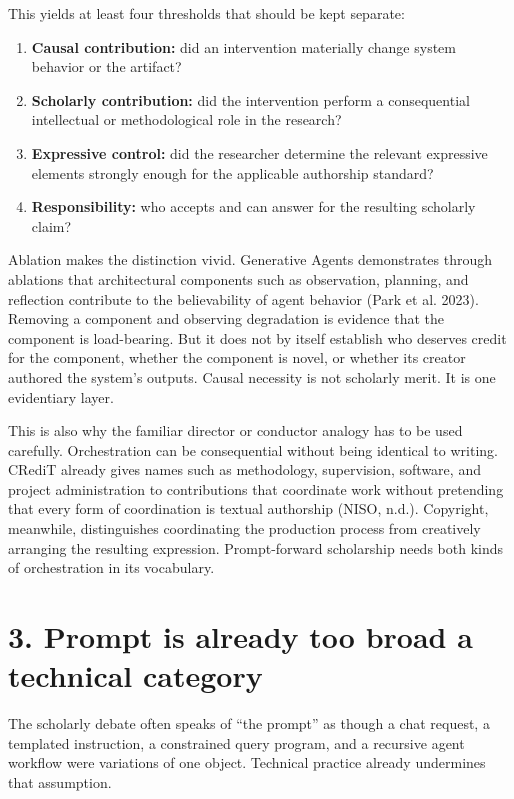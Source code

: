 \documentclass[
]{article}
\providecommand{\tightlist}{%
  \setlength{\itemsep}{0pt}\setlength{\parskip}{0pt}}
\begin{document}
This yields at least four thresholds that should be kept separate:

\begin{enumerate}
\def\labelenumi{\arabic{enumi}.}
\tightlist
\item
  \textbf{Causal contribution:} did an intervention materially change
  system behavior or the artifact?
\item
  \textbf{Scholarly contribution:} did the intervention perform a
  consequential intellectual or methodological role in the research?
\item
  \textbf{Expressive control:} did the researcher determine the relevant
  expressive elements strongly enough for the applicable authorship
  standard?
\item
  \textbf{Responsibility:} who accepts and can answer for the resulting
  scholarly claim?
\end{enumerate}

Ablation makes the distinction vivid. Generative Agents demonstrates
through ablations that architectural components such as observation,
planning, and reflection contribute to the believability of agent
behavior (Park et al. 2023). Removing a component and observing
degradation is evidence that the component is load-bearing. But it does
not by itself establish who deserves credit for the component, whether
the component is novel, or whether its creator authored the system's
outputs. Causal necessity is not scholarly merit. It is one evidentiary
layer.

This is also why the familiar director or conductor analogy has to be
used carefully. Orchestration can be consequential without being
identical to writing. CRediT already gives names such as methodology,
supervision, software, and project administration to contributions that
coordinate work without pretending that every form of coordination is
textual authorship (NISO, n.d.). Copyright, meanwhile, distinguishes
coordinating the production process from creatively arranging the
resulting expression. Prompt-forward scholarship needs both kinds of
orchestration in its vocabulary.

\section{3. Prompt is already too broad a technical
category}\label{prompt-is-already-too-broad-a-technical-category}

The scholarly debate often speaks of ``the prompt'' as though a chat
request, a templated instruction, a constrained query program, and a
recursive agent workflow were variations of one object. Technical
practice already undermines that assumption.
\end{document}
